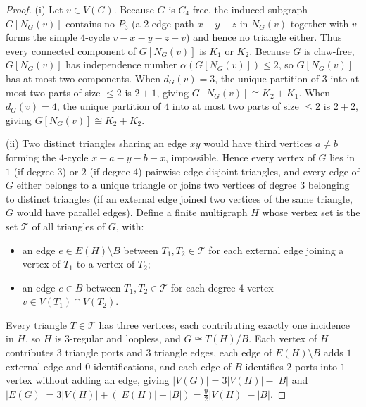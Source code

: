 \documentclass[11pt,reqno]{amsart}
\theoremstyle{plain}
\theoremstyle{definition}
\theoremstyle{remark}
\DeclareRobustCommand{\_}{\ifmmode\text{\textunderscore}\else\textunderscore\allowbreak\fi}
\begin{document}
\begin{proof}
(i) Let $v \in V(G)$. Because $G$ is $C_4$-free, the induced subgraph $G[N_G(v)]$ contains no $P_3$ (a $2$-edge path $x - y - z$ in $N_G(v)$ together with $v$ forms the simple $4$-cycle $v - x - y - z - v$) and hence no triangle either. Thus every connected component of $G[N_G(v)]$ is $K_1$ or $K_2$. Because $G$ is claw-free, $G[N_G(v)]$ has independence number $\alpha(G[N_G(v)]) \le 2$, so $G[N_G(v)]$ has at most two components. When $d_G(v) = 3$, the unique partition of $3$ into at most two parts of size $\le 2$ is $2 + 1$, giving $G[N_G(v)] \cong K_2 + K_1$. When $d_G(v) = 4$, the unique partition of $4$ into at most two parts of size $\le 2$ is $2 + 2$, giving $G[N_G(v)] \cong K_2 + K_2$.

(ii) Two distinct triangles sharing an edge $xy$ would have third vertices $a \neq b$ forming the $4$-cycle $x - a - y - b - x$, impossible. Hence every vertex of $G$ lies in $1$ (if degree $3$) or $2$ (if degree $4$) pairwise edge-disjoint triangles, and every edge of $G$ either belongs to a unique triangle or joins two vertices of degree $3$ belonging to distinct triangles (if an external edge joined two vertices of the same triangle, $G$ would have parallel edges). Define a finite multigraph $H$ whose vertex set is the set $\mathcal{T}$ of all triangles of $G$, with:
\begin{itemize}[leftmargin=1.6em]
  \item an edge $e \in E(H) \setminus B$ between $T_1, T_2 \in \mathcal{T}$ for each external edge joining a vertex of $T_1$ to a vertex of $T_2$;
  \item an edge $e \in B$ between $T_1, T_2 \in \mathcal{T}$ for each degree-$4$ vertex $v \in V(T_1) \cap V(T_2)$.
\end{itemize}
Every triangle $T \in \mathcal{T}$ has three vertices, each contributing exactly one incidence in $H$, so $H$ is $3$-regular and loopless, and $G \cong T(H)/B$. Each vertex of $H$ contributes $3$ triangle ports and $3$ triangle edges, each edge of $E(H) \setminus B$ adds $1$ external edge and $0$ identifications, and each edge of $B$ identifies $2$ ports into $1$ vertex without adding an edge, giving $|V(G)| = 3|V(H)| - |B|$ and $|E(G)| = 3|V(H)| + (|E(H)| - |B|) = \frac{9}{2}|V(H)| - |B|$.


\end{proof}
\end{document}
